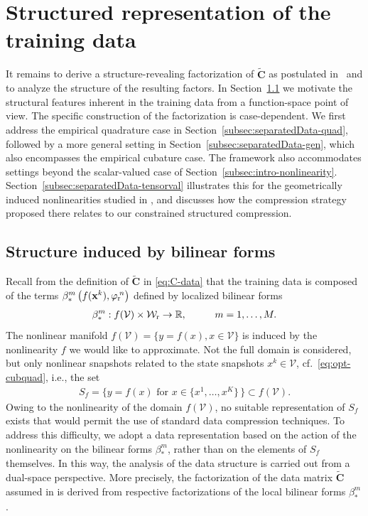\documentclass[onefignum,onetabnum]{siamart251104}
\newcommand{\bv}[1]{{\mathbf #1}}
\newcommand{\bt}[1]{{\mathbf{#1}}}
\newcommand{\funSpace}[1]{\mathcal{#1}}
\newcommand{\rom}[1]{{{#1}_{\rm{r}}}}
\newcommand{\R}{\mathbb{R}}
\newcommand{\tL}{{\fs{\varphi}}}
\newcommand{\fs}[1]{{{#1}}} %
\newcommand{\Cp}{{\bt{C}}}
\begin{document}
\section{Structured representation of the training data} \label{sec:separatedData}
It remains to derive a structure-revealing factorization of $\tilde{\Cp}$ as postulated in~ and to analyze the structure of the resulting factors.
In Section~\ref{subsec:motivate-factori} we motivate the structural features inherent in the training data from a function-space point of view. The specific construction of the factorization is case-dependent. We first address the empirical quadrature case in Section~\ref{subsec:separatedData-quad}, followed by a more general setting in Section~\ref{subsec:separatedData-gen}, which also encompasses the empirical cubature case.
The framework also accommodates settings beyond the scalar-valued case of Section~\ref{subsec:intro-nonlinearity}. Section~\ref{subsec:separatedData-tensorval} illustrates this for the geometrically induced nonlinearities studied in \cite{art:Guo2024,art:Guo2024-secOrd}, and discusses how the compression strategy proposed there relates to our constrained structured compression.
\subsection{Structure induced by bilinear forms} \label{subsec:motivate-factori}
Recall from the definition of $\tilde{\Cp}$ in \eqref{eq:C-data} that the training data is composed of the terms $\beta_{\rm{*}}^m\left( f(\bv{x}^k) , \rom{\tL}\!^n \right)$ defined by localized bilinear forms
\begin{align*}
 \beta_{\rm{*}}^m: f(\funSpace{V}) \times \rom{\funSpace{W}} \rightarrow \R, \hspace{1cm} m = 1,\ldots , M.
\end{align*}
The nonlinear manifold $f(\funSpace{V})= \{y = f(x), x\in \funSpace{V} \}$ is induced by the nonlinearity $f$ we would like to approximate. Not the full domain is considered, but only nonlinear snapshots related to the state snapshots $x^k\in \funSpace{V}$, cf.~\eqref{eq:opt-cubquad}, i.e., the set
\begin{align*}
 S_f = \{y = f(x) \text{ for } x\in \{x^1, \ldots, x^K \} \, \} \subset f(\funSpace{V}).  %
\end{align*}
Owing to the nonlinearity of the domain $f(\funSpace{V})$, no suitable representation of $S_f$ exists that would permit the use of standard data compression techniques. To address this difficulty, we adopt a data representation based on the action of the nonlinearity on the bilinear forms $\beta_{\!*}^m$, rather than on the elements of $S_f$ themselves. In this way, the analysis of the data structure is carried out from a dual-space perspective. More precisely, the factorization of the data matrix $\tilde{\Cp}$ assumed in  is derived from respective factorizations of the local bilinear forms $\beta_{\!*}^m$.
\end{document}
